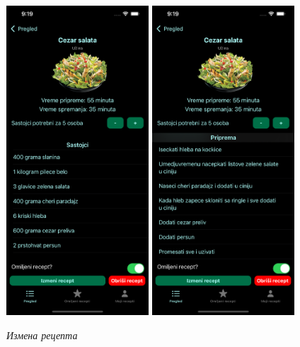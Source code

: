 \documentclass[12pt,oneside]{memoir}
\begin{document}
\begin{figure} [H]
    \centering
    \captionsetup{justification=centering}
    \includegraphics[width=0.475\textwidth]{images/simulators/testing images/detail recipe change 1.png}
    \hfill
    \includegraphics[width=0.475\textwidth]{images/simulators/testing images/detail recipe change 2.png}
    \caption{\textit{Измена рецепта}}
    \label{slika:приказ_измењеног_рецепта}
\end{figure}
\end{document}
